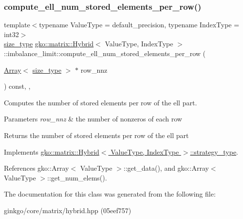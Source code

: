 \subsubsection{\texorpdfstring{compute\+\_\+ell\+\_\+num\+\_\+stored\+\_\+elements\+\_\+per\+\_\+row()}{compute\_ell\_num\_stored\_elements\_per\_row()}}
{\footnotesize\ttfamily template$<$typename Value\+Type = default\+\_\+precision, typename Index\+Type = int32$>$ \\
\hyperlink{namespacegko_a6e5c95df0ae4e47aab2f604a22d98ee7}{size\+\_\+type} \hyperlink{classgko_1_1matrix_1_1Hybrid}{gko\+::matrix\+::\+Hybrid}$<$ Value\+Type, Index\+Type $>$\+::imbalance\+\_\+limit\+::compute\+\_\+ell\+\_\+num\+\_\+stored\+\_\+elements\+\_\+per\+\_\+row (\begin{DoxyParamCaption}\item[{\hyperlink{classgko_1_1Array}{Array}$<$ \hyperlink{namespacegko_a6e5c95df0ae4e47aab2f604a22d98ee7}{size\+\_\+type} $>$ $\ast$}]{row\+\_\+nnz }\end{DoxyParamCaption}) const\hspace{0.3cm}{\ttfamily [inline]}, {\ttfamily [override]}, {\ttfamily [virtual]}}



Computes the number of stored elements per row of the ell part. 


\begin{DoxyParams}{Parameters}
{\em row\+\_\+nnz} & the number of nonzeros of each row\\
\hline
\end{DoxyParams}
\begin{DoxyReturn}{Returns}
the number of stored elements per row of the ell part 
\end{DoxyReturn}


Implements \hyperlink{classgko_1_1matrix_1_1Hybrid_1_1strategy__type_a0a0cd4024f27c7d0f286f35fc0a6de60}{gko\+::matrix\+::\+Hybrid$<$ Value\+Type, Index\+Type $>$\+::strategy\+\_\+type}.



References gko\+::\+Array$<$ Value\+Type $>$\+::get\+\_\+data(), and gko\+::\+Array$<$ Value\+Type $>$\+::get\+\_\+num\+\_\+elems().



The documentation for this class was generated from the following file\+:\begin{DoxyCompactItemize}
\item 
ginkgo/core/matrix/hybrid.\+hpp (05eef757)\end{DoxyCompactItemize}
